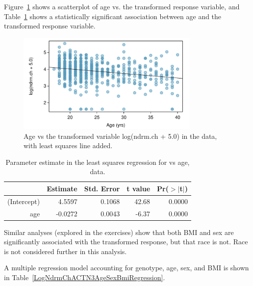 Figure~\ref{logNdrmChAgePlot} shows a scatterplot of age vs. the transformed response variable, and Table~\ref{logNdrmChAgeRegression} shows a statistically significant association between age and the transformed response variable.

\begin{figure}[h!]
	\centering
	\includegraphics[width=0.8\textwidth]
	{ch_multiple_linear_regression_oi_biostat/figures/logNdrmChAgePlot/logNdrmChAgePlot.pdf}
	\caption{Age vs the transformed variable log(ndrm.ch + 5.0) in the  data, with least squares line added.}
	\label{logNdrmChAgePlot}
\end{figure}




\begin{table}[ht]
\centering
\begin{tabular}{rrrrr}
  \hline
 & Estimate & Std. Error & t value & Pr($>$$|$t$|$) \\ 
  \hline
(Intercept) & 4.5597 & 0.1068 & 42.68 & 0.0000 \\ 
  age & -0.0272 & 0.0043 & -6.37 & 0.0000 \\ 
   \hline
\end{tabular}
\caption{Parameter estimate in the least squares regression for  vs age,  data.}
\label{logNdrmChAgeRegression}
\end{table}

Similar analyses (explored in the exercises) show that both BMI and sex are significantly associated with the transformed response, but that race is not.  Race is not considered further in this analysis.

A multiple regression model accounting for genotype, age, sex, and BMI is shown in Table~\ref{LogNdrmChACTN3AgeSexBmiRegression}.

